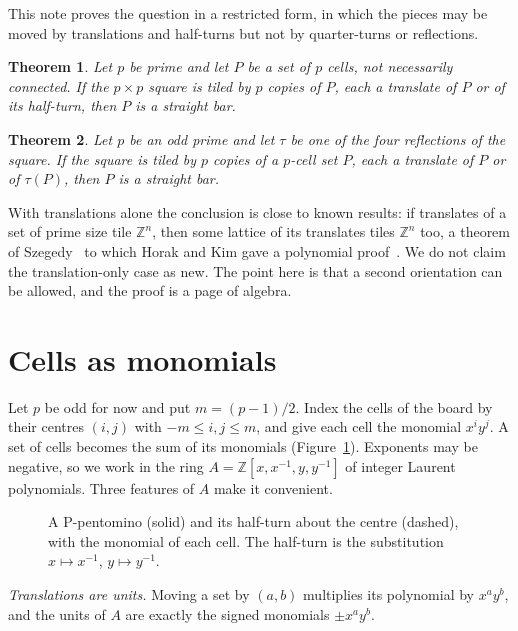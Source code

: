 \documentclass[11pt]{article}
\newtheorem{theorem}{Theorem}
\theoremstyle{remark}
\newcommand{\Z}{\mathbb{Z}}
\begin{document}
This note proves the question in a restricted form, in which the pieces may be moved by translations and
half-turns but not by quarter-turns or reflections.

\begin{theorem}\label{thm:half}
Let $p$ be prime and let $P$ be a set of $p$ cells, not necessarily connected. If the $p\times p$ square is
tiled by $p$ copies of $P$, each a translate of $P$ or of its half-turn, then $P$ is a straight bar.
\end{theorem}

\begin{theorem}\label{thm:refl}
Let $p$ be an odd prime and let $\tau$ be one of the four reflections of the square. If the square is tiled by
$p$ copies of a $p$-cell set $P$, each a translate of $P$ or of $\tau(P)$, then $P$ is a straight bar.
\end{theorem}

With translations alone the conclusion is close to known results: if translates of a set of prime size tile
$\Z^n$, then some lattice of its translates tiles $\Z^n$ too, a theorem of Szegedy~\cite{Sze98} to which
Horak and Kim gave a polynomial proof~\cite{HK16}. We do not claim the translation-only case as new. The point here is that a second
orientation can be allowed, and the proof is a page of algebra.

\section{Cells as monomials}

Let $p$ be odd for now and put $m=(p-1)/2$. Index the cells of the board by their centres $(i,j)$ with
$-m\le i,j\le m$, and give each cell the monomial $x^iy^j$. A set of cells becomes the sum of its monomials
(Figure~\ref{fig:encoding}). Exponents may be negative, so we work in the ring
$A=\Z[x,x^{-1},y,y^{-1}]$ of integer Laurent polynomials. Three features of $A$ make it convenient.

\begin{figure}[ht]
\centering

\caption{A P-pentomino (solid) and its half-turn about the centre (dashed), with the monomial of each cell.
The half-turn is the substitution $x\mapsto x^{-1}$, $y\mapsto y^{-1}$.}
\label{fig:encoding}
\end{figure}

\emph{Translations are units.} Moving a set by $(a,b)$ multiplies its polynomial by $x^ay^b$, and the units of
$A$ are exactly the signed monomials $\pm x^ay^b$.
\end{document}
